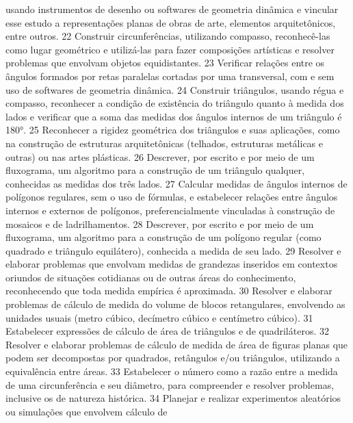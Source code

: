 {{{				usando instrumentos de desenho ou softwares de geometria dinâmica e vincular esse estudo a
				representações planas de obras de arte, elementos arquitetônicos, entre outros.
			}
			{22}{%
				Construir circunferências, utilizando compasso, reconhecê-las como lugar
				geométrico e utilizá-las para fazer composições artísticas e resolver problemas que envolvam
				objetos equidistantes.
			}
			{23}{%
				Verificar relações entre os ângulos formados por retas paralelas cortadas por uma
				transversal, com e sem uso de softwares de geometria dinâmica.
			}
			{24}{%
				Construir triângulos, usando régua e compasso, reconhecer a condição de
				existência do triângulo quanto à medida dos lados e verificar que a soma das medidas dos
				ângulos internos de um triângulo é 180°.
			}
			{25}{%
				Reconhecer a rigidez geométrica dos triângulos e suas aplicações, como na construção
				de estruturas arquitetônicas (telhados, estruturas metálicas e outras) ou nas artes plásticas.
			}
			{26}{%
				Descrever, por escrito e por meio de um fluxograma, um algoritmo para a construção de
				um triângulo qualquer, conhecidas as medidas dos três lados.
			}
			{27}{%
				Calcular medidas de ângulos internos de polígonos regulares, sem o uso
				de fórmulas, e estabelecer relações entre ângulos internos e externos de polígonos,
				preferencialmente vinculadas à construção de mosaicos e de ladrilhamentos.
			}
			{28}{%
				Descrever, por escrito e por meio de um fluxograma, um algoritmo para a
				construção de um polígono regular (como quadrado e triângulo equilátero), conhecida a
				medida de seu lado.
			}
			{29}{%
				Resolver e elaborar problemas que envolvam medidas de grandezas inseridos em
				contextos oriundos de situações cotidianas ou de outras áreas do conhecimento, reconhecendo
				que toda medida empírica é aproximada.
			}
			{30}{%
				Resolver e elaborar problemas de cálculo de medida do volume de blocos retangulares,
				envolvendo as unidades usuais (metro cúbico, decímetro cúbico e centímetro cúbico).
			}
			{31}{%
				Estabelecer expressões de cálculo de área de triângulos e de quadriláteros.
			}
			{32}{%
				Resolver e elaborar problemas de cálculo de medida de área de figuras planas que
				podem ser decompostas por quadrados, retângulos e/ou triângulos, utilizando a equivalência
				entre áreas.
			}
			{33}{%
				Estabelecer o número como a razão entre a medida de uma circunferência e seu
				diâmetro, para compreender e resolver problemas, inclusive os de natureza histórica.
			}
			{34}{%
				Planejar e realizar experimentos aleatórios ou simulações que envolvem cálculo de
}}}
